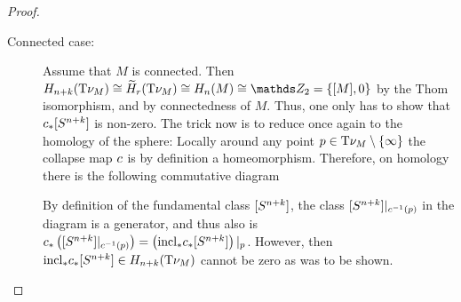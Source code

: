 \begin{Lem}
\begin{proof}
    \begin{description}
    \item[Connected case:]
      Assume that $M$ is connected.
      Then
      $H_{n+k}(\Thomspace{\N M})
      \cong\relH_r(\Thomspace{\N M})
      \cong H_n(M) \cong \Zmod2=\{\fundcl M, 0\}$ by
      the Thom isomorphism, and by connectedness of $M$.
      Thus, one only has to show that
      ${c}_*[S^{n+k}]$
      is non-zero.    
      The trick now is to reduce once again to the homology of the
      sphere:
      Locally around any point $p\in\mathrm{T}{\nu_{M}}\setminus\{\infty\}$ the
      collapse map $c$ is by definition a
      homeomorphism. Therefore, on homology there is the following 
      commutative diagram
      \begin{center}
      \end{center}
      By definition of the fundamental class $[S^{n+k}]$,
      the class $[S^{n+k}]|_{c^{-1}(p)}$ in the
      diagram is a generator, and thus also is
      ${c}_*\left([S^{n+k}]|_{c^{-1}(p)}\right)
      = \left({\mathrm{incl}}_*{c}_*[S^{n+k}]\right)|_p$.
      However, then ${\mathrm{incl}}_*{c}_*[S^{n+k}]\in
      H_{n+k}(\mathrm{T}{\nu_{M}})$
      cannot be zero as was to be shown.


\end{description}
\end{proof}
\end{Lem}
